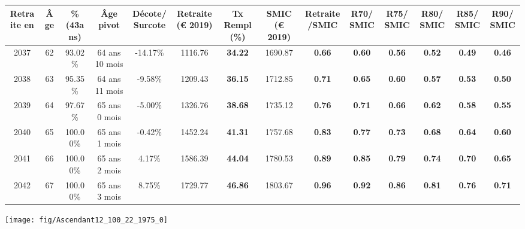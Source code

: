 \begin{adjustbox}{max width=\textwidth} 
\begin{tabular}[htb]{|c|c||c|c|c||c|c||c|c||c|c|c|c|c|} 
\hline 
 Retraite en &  Âge &  \%(43ans) &  Âge pivot &  Décote/Surcote &  Retraite (\euro{} 2019) &  Tx Rempl(\%) &  SMIC (\euro{} 2019) &  Retraite/SMIC &  R70/SMIC &  R75/SMIC &  R80/SMIC &  R85/SMIC &  R90/SMIC \\ 
\hline \hline 
 2037 &  62 &  93.02\% &  64 ans 10 mois &  -14.17\% &  1116.76 &  {\bf 34.22} &  1690.87 &  {\bf {\color{red} 0.66}} &  {\bf {\color{red} 0.60}} &  {\bf {\color{red} 0.56}} &  {\bf {\color{red} 0.52}} &  {\bf {\color{red} 0.49}} &  {\bf {\color{red} 0.46}} \\ 
\hline 
 2038 &  63 &  95.35\% &  64 ans 11 mois &  -9.58\% &  1209.43 &  {\bf 36.15} &  1712.85 &  {\bf {\color{red} 0.71}} &  {\bf {\color{red} 0.65}} &  {\bf {\color{red} 0.60}} &  {\bf {\color{red} 0.57}} &  {\bf {\color{red} 0.53}} &  {\bf {\color{red} 0.50}} \\ 
\hline 
 2039 &  64 &  97.67\% &  65 ans 0 mois &  -5.00\% &  1326.76 &  {\bf 38.68} &  1735.12 &  {\bf {\color{red} 0.76}} &  {\bf {\color{red} 0.71}} &  {\bf {\color{red} 0.66}} &  {\bf {\color{red} 0.62}} &  {\bf {\color{red} 0.58}} &  {\bf {\color{red} 0.55}} \\ 
\hline 
 2040 &  65 &  100.00\% &  65 ans 1 mois &  -0.42\% &  1452.24 &  {\bf 41.31} &  1757.68 &  {\bf {\color{red} 0.83}} &  {\bf {\color{red} 0.77}} &  {\bf {\color{red} 0.73}} &  {\bf {\color{red} 0.68}} &  {\bf {\color{red} 0.64}} &  {\bf {\color{red} 0.60}} \\ 
\hline 
 2041 &  66 &  100.00\% &  65 ans 2 mois &  4.17\% &  1586.39 &  {\bf 44.04} &  1780.53 &  {\bf {\color{red} 0.89}} &  {\bf {\color{red} 0.85}} &  {\bf {\color{red} 0.79}} &  {\bf {\color{red} 0.74}} &  {\bf {\color{red} 0.70}} &  {\bf {\color{red} 0.65}} \\ 
\hline 
 2042 &  67 &  100.00\% &  65 ans 3 mois &  8.75\% &  1729.77 &  {\bf 46.86} &  1803.67 &  {\bf {\color{red} 0.96}} &  {\bf {\color{red} 0.92}} &  {\bf {\color{red} 0.86}} &  {\bf {\color{red} 0.81}} &  {\bf {\color{red} 0.76}} &  {\bf {\color{red} 0.71}} \\ 
\hline 
\hline 
\end{tabular} 
\end{adjustbox} 
 
 \vspace{0.1cm} 

 {\hspace{-2.2cm}\texttt{[image: fig/Ascendant12\_100\_22\_1975\_0]}} 

